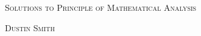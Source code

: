 \documentclass[dvipsnames]{article}%
\begin{document}
\begin{center}
  \begin{center}
  \vspace*{\fill}
  \textsc{\LARGE Solutions to Principle of Mathematical Analysis}
  \bigskip

  \textsc{\LARGE Dustin Smith}
  \vspace*{\fill}
\end{center}
\end{center}

\newpage

\tableofcontents

\newpage




\end{document}
